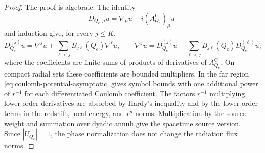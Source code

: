 \documentclass[11pt]{article}
\numberwithin{equation}{section}
\theoremstyle{plain}
\theoremstyle{definition}
\theoremstyle{remark}
\begin{document}
\begin{proof}
The proof is algebraic.  The identity
\begin{equation}
 D_{Q_e,\mu}u=\nabla_\mu u-i(A^{\mathrm C}_{Q_e})_\mu u
\end{equation}
and induction give, for every $j\le K$,
\begin{equation}
 D_{Q_e}^{(j)}u=\nabla^j u+\sum_{\ell<j}B_{j\ell}(Q_e)\nabla^\ell u,
 \qquad
 \nabla^j u=D_{Q_e}^{(j)}u+\sum_{\ell<j}\widetilde B_{j\ell}(Q_e)D_{Q_e}^{(\ell)}u,
\end{equation}
where the coefficients are finite sums of products of derivatives of $A^{\mathrm C}_{Q_e}$.  On compact radial sets these coefficients are bounded multipliers.  In the far region \eqref{eq:coulomb-potential-asymptotic} gives symbol bounds with one additional power of $r^{-1}$ for each differentiated Coulomb coefficient.  The factors $r^{-1}$ multiplying lower-order derivatives are absorbed by Hardy's inequality and by the lower-order terms in the redshift, local-energy, and $r^p$ norms.  Multiplication by the source weight and summation over dyadic annuli give the spacetime source version.  Since $|U_{Q_e}|=1$, the phase normalization does not change the radiation flux norms.
\end{proof}
\end{document}
